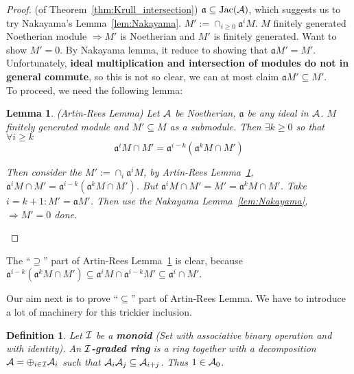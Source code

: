 \documentclass[11pt]{article}
\newtheorem{lemma}[thm]{Lemma}
\newtheorem{dfn}[thm]{Definition}
\newcommand{\sca}{{\mathfrak a}}
\newcommand{\cala}{{\cal A}}
\newcommand{\cali}{{\cal I}}
\newcommand{\Lrta}{\Longrightarrow}
\begin{document}
\begin{proof}(of Theorem~\ref{thm:Krull_intersection})
$\sca\subseteq \text{Jac}(\cala)$, which suggests us to  try Nakayama's Lemma~\ref{lem:Nakayama}.
$M':=\cap_{i\geq 0}\sca^i M.$ $M$ finitely generated Noetherian module $\Lrta M'$ is Noetherian and $M'$ is finitely generated. Want to show $M'=0$. By Nakayama lemma, it reduce to showing that $\sca M'=M'$.\\
Unfortunately, \textbf{ideal multiplication and intersection of modules do not in general commute}, so this is not so clear, we can at most claim $\sca M'\subseteq M'$.\\ 
To proceed, we need the following lemma:
\begin{lemma}\label{lem:Artin-Rees}
(Artin-Rees Lemma) Let $\cala$ be Noetherian, $\sca$ be any ideal in $\cala$. $M$ finitely generated module and $M'\subseteq M$ as a submodule. Then $\exists k\geq 0 $ so that $\forall i\geq k$
$$
\sca^i M\cap M'=\sca^{i-k}(\sca^k M\cap M')
$$

Then consider the $M':=\cap_i\sca^i M$, by Artin-Rees Lemma~\ref{lem:Artin-Rees}, $\sca^i M\cap M'=\sca^{i-k}(\sca^k M\cap M')$. But $\sca^i M\cap M'=M'=\sca^k M\cap M'$. Take $i=k+1: M'=\sca M'$. Then use the Nakayama Lemma~\ref{lem:Nakayama}, $\Lrta M'=0$   done.
\end{lemma}
\end{proof}

The ``$\supseteq$'' part of Artin-Rees Lemma~\ref{lem:Artin-Rees} is clear, because $\sca^{i-k}(\sca^k M\cap M')\subseteq \sca^i M\cap\sca^{i-k}M'\subseteq\sca^i\cap M'$.

Our aim next is to prove ``$\subseteq $'' part of Artin-Rees Lemma. We have to introduce a lot of machinery for this trickier inclusion.
\begin{dfn}
Let $\cali$ be a \textbf{monoid} (Set with associative binary operation and with identity). An \textbf{$\cali$-graded ring} is a ring together with a decomposition $\cala=\oplus_{i\in \cali}\cala_i$ such that $\cala_i\cala_j\subseteq \cala_{i+j}$. Thus $1\in \cala_0$.
\end{dfn}
\end{document}
